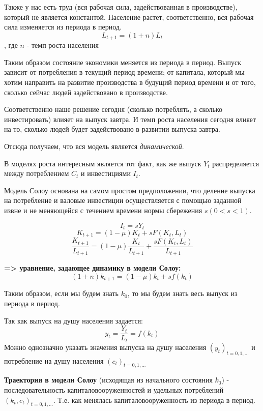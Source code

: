 \documentclass[reqno]{article}
\theoremstyle{definition}
\theoremstyle{definition}
\theoremstyle{definition}
\theoremstyle{definition}
\theoremstyle{definition}
\theoremstyle{definition}
\theoremstyle{definition}
\theoremstyle{definition}
\theoremstyle{definition}
\begin{document}
		Также у нас есть труд (вся рабочая сила, задействованная в производстве), который не является константой. Население растет, соответственно, вся рабочая сила изменяется из периода в период. 
		\begin{equation}\label{eq:1.3.3}
			L_{t+1} = (1 + n) L_t
		\end{equation}
		, где $n$ - темп роста населения
		
		Таким образом состояние экономики меняется из периода в период. Выпуск зависит от потребления в текущий период времени; от капитала, который мы хотим направить на развитие производства в будущий период времени и от того, сколько сейчас людей задействовано в производстве. 
		
		Соответственно наше решение сегодня (сколько потреблять, а сколько инвестировать) влияет на выпуск завтра. И темп роста населения сегодня влияет на то, сколько людей будет задействовано в развитии выпуска завтра. 
		
		Отсюда получаем, что вся модель является \emph{динамической}.\bigskip
		
		В моделях роста интересным является тот факт, как же выпуск $Y_t$ распределяется между потреблением $C_t$ и инвестициями $I_t$.
		
		Модель Солоу основана на самом простом предположении, что деление выпуска на потребление и валовые инвестиции осуществляется с помощью заданной извне и не меняющейся с течением времени нормы сбережения $s (0 < s < 1)$. 
		
		$$I_t = s Y_t$$
		$$K_{t+1} = (1 - \mu) K_t + s F(K_t, L_t)$$
		$$\frac{K_{t+1}}{L_{t+1}} = (1 - \mu) \frac{K_t}{L_{t+1}} + \frac{s F(K_t, L_t)}{L_{t+1}}$$
		
		\textbf{=> уравнение, задающее динамику в модели Солоу:}
		\begin{equation}\label{eq:1.3.4}
			(1 + n) k_{t + 1} = (1 - \mu) k_t + s f(k_t)
		\end{equation}
		
		Таким образом, если мы будем знать $k_0$, то мы будем знать весь выпуск из периода в период.
		
		Так как выпуск на душу населения задается:
		$$y_t = \frac{Y_t}{L_t} = f(k_t)$$
		Можно однозначно указать значения выпуска на душу населения $(y_t)_{t=0,1,\dots }$ и потребление на душу населения $(c_t)_{t=0,1,\dots}$ \bigskip
		
		\textbf{Траектория в модели Солоу} (исходящая из начального состояния $k_0$) - последовательность капиталовооруженностей и удельных потреблений $(k_t, c_t)_{t=0,1,\dots}$. Т.е. как менялась капиталовооруженность из периода в период.
		
\end{document}
